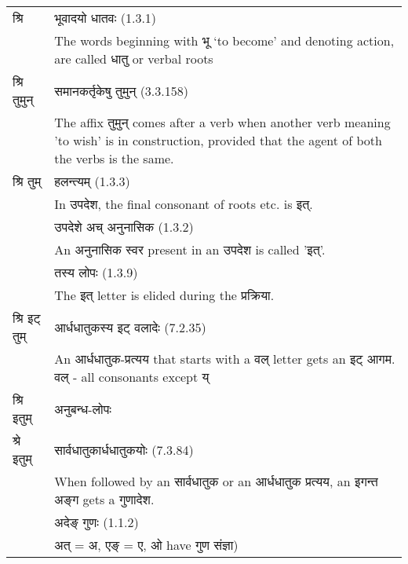 		\begin{longtable}{ |p{1.6cm}|p{14.4cm}| } 
			\hline
			\rowcolor{red!10}
			\texthindi{श्रि}&
			\texthindi{भूवादयो धातवः} (1.3.1)\\ 
			\rowcolor{red!10}&The words beginning with \texthindi{भू} ‘to become’ and denoting action, are called \texthindi{धातु} or verbal roots
			\\\hline
			
			\rowcolor{blue!10}
			\texthindi{श्रि तुमुन्}&
			\texthindi{समानकर्तृकेषु तुमुन्} (3.3.158)\\
			\rowcolor{blue!10}
			&The affix \texthindi{तुमुन्} comes after a verb when another verb meaning 'to wish' is in construction, provided that the agent of both the verbs is the same.
			\\\hline
			
			\rowcolor{blue!10}
			\texthindi{श्रि तुम्}&
			\texthindi{हलन्त्यम्} (1.3.3)\\
			\rowcolor{blue!10}
			&In \texthindi{उपदेश}, the final consonant of roots etc. is \texthindi{इत्}.\\
			\hline
			
			\rowcolor{blue!10}
			&\texthindi{उपदेशे अच् अनुनासिक} (1.3.2)\\
			\rowcolor{blue!10}
			&An \texthindi{अनुनासिक स्वर} present in an \texthindi{उपदेश} is called '\texthindi{इत्}'.\\
			\hline
			\rowcolor{blue!10}
			&\texthindi{तस्य लोपः} (1.3.9)\\
			\rowcolor{blue!10}
			&The \texthindi{इत्} letter is elided during the \texthindi{प्रक्रिया}.\\
			\hline
			
			\rowcolor{green!10}
			\texthindi{श्रि इट् तुम्}&
			\texthindi{आर्धधातुकस्य इट् वलादेः} (7.2.35)\\
			\rowcolor{green!10}
			&An \texthindi{आर्धधातुक-प्रत्यय} that starts with a \texthindi{वल्} letter gets an \texthindi{इट् आगम}. 
			\texthindi{वल्} - all consonants except \texthindi{य्}
			\\\hline
			
			\rowcolor{green!10}
			\texthindi{श्रि इतुम्}&
			\texthindi{अनुबन्ध-लोपः}
			\\\hline
			
			\rowcolor{yellow!10}
			\texthindi{श्रे इतुम्}&
			\texthindi{सार्वधातुकार्धधातुकयोः} (7.3.84)\\
			\rowcolor{yellow!10}
			&When followed by an \texthindi{सार्वधातुक} or an \texthindi{आर्धधातुक प्रत्यय}, an \texthindi{इगन्त अङ्ग} gets a \texthindi{गुणादेश}.\\
			\rowcolor{yellow!10}
			&\texthindi{अदेङ् गुणः} (1.1.2)\\
			\rowcolor{yellow!10}
			& \texthindi{अत्} = \texthindi{अ}, \texthindi{एङ्} = \texthindi{ए, ओ} have \texthindi{गुण संज्ञा})
			\\\hline
			

\end{longtable}
